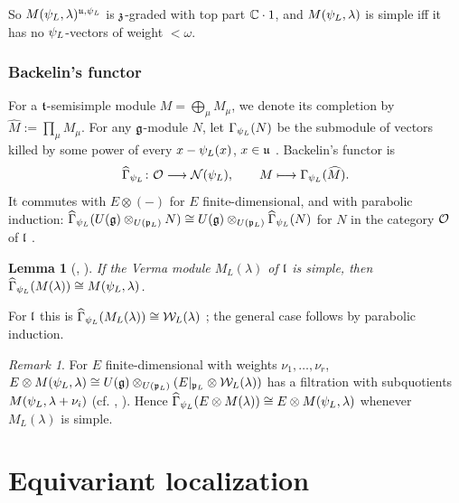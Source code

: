 \documentclass{article}
\theoremstyle{plain}
\newtheorem{lemma}[theorem]{Lemma}
\theoremstyle{definition}
\theoremstyle{remark}
\newtheorem{remark}[theorem]{Remark}
\numberwithin{equation}{section}
\begin{document}
So $M(\psi_L,\lambda)^{\mathfrak{u},\psi_L}$ is $\mathfrak{z}$-graded with top part $\mathbb{C}\cdot1$, and $M(\psi_L,\lambda)$ is simple iff it has no $\psi_L$-vectors of weight $<\omega$.

\subsubsection{Backelin's functor}\label{sec:backelin}
For a $\mathfrak{t}$-semisimple module $M=\bigoplus_\mu M_\mu$, we denote its completion by $\widehat M:=\prod_\mu M_\mu$. For any $\mathfrak{g}$-module $N$, let $\Gamma_{\psi_L}(N)$ be the submodule of vectors killed by some power of every $x-\psi_L(x)$, $x\in\mathfrak{u}$ \cite[\S6]{Backelinfunctor}. Backelin's functor is
\begin{equation}\label{eq:backelin}
\widehat\Gamma_{\psi_L}\colon\mathcal{O}\longrightarrow\mathcal{N}(\psi_L),\qquad M\longmapsto\Gamma_{\psi_L}(\widehat M).
\end{equation}
It commutes with $E\otimes(-)$ for $E$ finite-dimensional, and with parabolic induction: $\widehat\Gamma_{\psi_L}(U(\mathfrak{g})\otimes_{U(\mathfrak{p}_L)}N)\cong U(\mathfrak{g})\otimes_{U(\mathfrak{p}_L)}\widehat\Gamma_{\psi_L}(N)$ for $N$ in the category $\mathcal{O}$ of $\mathfrak{l}$ \cite[Remark 2.5.5]{eberhardt2024proofsjantzenconjecturewhittaker}.

\begin{lemma}[{\cite[Proposition 6.9]{Backelinfunctor}, \cite[Theorem 2.5.4]{eberhardt2024proofsjantzenconjecturewhittaker}}]\label{lem:backelin-verma}
If the Verma module $M_L(\lambda)$ of $\mathfrak{l}$ is simple, then $\widehat\Gamma_{\psi_L}(M(\lambda))\cong M(\psi_L,\lambda)$.
\end{lemma}

For $\mathfrak{l}$ this is $\widehat\Gamma_{\psi_L}(M_L(\lambda))\cong\mathcal{W}_L(\lambda)$ \cite[Lemmas 6.5, 6.6]{Backelinfunctor}; the general case follows by parabolic induction.

\begin{remark}\label{rem:tensor-filtration}
For $E$ finite-dimensional with weights $\nu_1,\dots,\nu_r$, $E\otimes M(\psi_L,\lambda)\cong U(\mathfrak{g})\otimes_{U(\mathfrak{p}_L)}(E|_{\mathfrak{p}_L}\otimes\mathcal{W}_L(\lambda))$ has a filtration with subquotients $M(\psi_L,\lambda+\nu_i)$ (cf. \cite[\S3]{Kostant1978}, \cite[\S2]{Milicic1997}). Hence $\widehat\Gamma_{\psi_L}(E\otimes M(\lambda))\cong E\otimes M(\psi_L,\lambda)$ whenever $M_L(\lambda)$ is simple.
\end{remark}

\section{Equivariant localization}\label{sec:localization}
\end{document}

